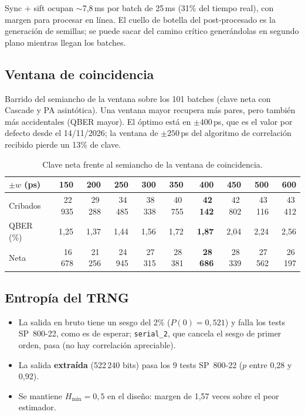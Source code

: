 \documentclass[a4paper,11pt]{article}
\newcommand{\code}[1]{\texttt{#1}}
\begin{document}
\noindent
Sync + sift ocupan $\sim$7,8\,ms por batch de 25\,ms (31\% del tiempo real), con margen para procesar en
línea. El cuello de botella del post-procesado es la generación de semillas; se puede sacar del camino
crítico generándolas en segundo plano mientras llegan los batches.

\subsection{Ventana de coincidencia}
\label{sec:ventana}
Barrido del semiancho de la ventana sobre los 101 batches (clave neta con Cascade y PA asintótica). Una
ventana mayor recupera más pares, pero también más accidentales (QBER mayor). El óptimo está en
$\pm400$\,ps, que es el valor por defecto desde el 14/11/2026; la ventana de $\pm250$\,ps del algoritmo de
correlación recibido pierde un 13\% de clave.

\begin{table}[htbp]
\centering
\caption{Clave neta frente al semiancho de la ventana de coincidencia.}
\small
\begin{tabular}{lrrrrrrrrr}
\toprule
$\pm w$ (ps) & 150 & 200 & 250 & 300 & 350 & \textbf{400} & 450 & 500 & 600 \\
\midrule
Cribados & 22\,935 & 29\,288 & 34\,485 & 38\,338 & 40\,755 & \textbf{42\,142} & 42\,802 & 43\,116 & 43\,412 \\
QBER (\%) & 1,25 & 1,37 & 1,44 & 1,56 & 1,72 & \textbf{1,87} & 2,04 & 2,24 & 2,56 \\
Neta & 16\,678 & 21\,256 & 24\,945 & 27\,315 & 28\,381 & \textbf{28\,686} & 28\,339 & 27\,562 & 26\,197 \\
\bottomrule
\end{tabular}
\end{table}

\subsection{Entropía del TRNG}



\begin{itemize}
  \item La salida en bruto tiene un sesgo del 2\% ($P(0) = 0{,}521$) y falla los tests SP~800-22, como es de
        esperar; \code{serial\_2}, que cancela el sesgo de primer orden, pasa (no hay correlación apreciable).
  \item La salida \textbf{extraída} (522\,240 bits) pasa los 9 tests SP~800-22 ($p$ entre 0,28 y 0,92).
  \item Se mantiene $H_{\min} = 0{,}5$ en el diseño: margen de 1,57 veces sobre el peor estimador.
\end{itemize}
\end{document}
